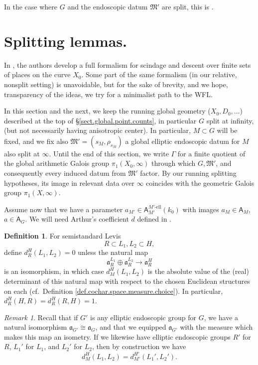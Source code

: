 \documentclass[openany]{amsbook}
\theoremstyle{definition}
\newtheorem{definition}[theorem]{Definition}
\theoremstyle{remark}
\newtheorem{remark}[theorem]{Remark}
\numberwithin{equation}{section}
\renewcommand{\-}{\operatorname{-}}
\renewcommand{\a}{\mathfrak{a}}
\newcommand{\el}{\text{-ell}}
\newcommand{\bA}{\mathsf{A}}
\newcommand{\fM}{\mathfrak{M}}
\begin{document}
In the case where $G$ and the endoscopic datum $\fM'$ are split, this is \cite[Th\'eor\`eme 19.1.1]{CLII}.


\section{Splitting lemmas.}\label{subsect.splitting.lemmas}

In \cite[\S 16]{CLII}, the authors develop a full formalism for scindage and descent over finite sets of places on the curve $X_0$. Some part of the same formalism (in our relative, nonsplit setting) is unavoidable, but for the sake of brevity, and we hope, transparency of the ideas, we try for a minimalist path to the WFL. 

In this section and the next, we keep the running global geometry ($X_0, D_0, \ldots$) described at the top of \S \ref{sect.global.point.counts}, in particular $G$ split at infinity, (but not necessarily having anisotropic center). In particular, $M \subset G$ will be fixed, and we fix also $\fM' = (s_M, \rho_{s_M})$ a global elliptic endoscopic datum for $M$ also split at $\infty$. Until the end of this section, we write $\Gamma$ for a finite quotient of the global arithmetic Galois group $\pi_1(X_0, \infty)$ through which $G, \fM'$, and consequently every induced datum from $\fM'$ factor. By our running splitting hypotheses, its image in relevant data over $\infty$ coincides with the geometric Galois group $\pi_1(X, \infty)$. 

Assume now that we have a parameter $a_{M'} \in \bA_{M'}^{M'\el}(k_0)$ with images $a_M \in \bA_M$, $a \in \bA_{G}$. We will need Arthur's coefficient $d$ defined in \cite[\S 7-9]{arthurinvlocal}.

\begin{definition}\label{def.Arthur.d}
    For semistandard Levis
    $$
        R \subset L_1, L_2 \subset H,
    $$
    define $d_R^H(L_1, L_2) = 0$ unless the natural map
    $$
        \a_R^{L_1} \oplus \a_R^{L_2} \to \a_R^H
    $$
    is an isomorphism, in which case $d_M^H(L_1, L_2)$ is the absolute value of the (real) determinant of this natural map with respect to the chosen Euclidean structures on each (cf.\ Definition \ref{def.cochar.space.measure.choice}). In particular, $d_R^H(H,R) = d_R^H(R,H) = 1$. 
\end{definition}

\begin{remark}\label{rmk.end.gp.Arthur.d}
    Recall that if $G'$ is any elliptic endoscopic group for $G$, we have a natural isomorphism $\a_{G'} \cong \a_G$, and that we equipped $\a_{G'}$ with the measure which makes this map an isometry. If we likewise have elliptic endoscopic groups $R'$ for $R$, $L_1'$ for $L_1$, and $L_2'$ for $L_2$, then by construction we have
    $$
        d_{M}^H(L_1, L_2) = d_{M'}^{H'}(L_1', L_2').
    $$
\end{remark}
\end{document}
